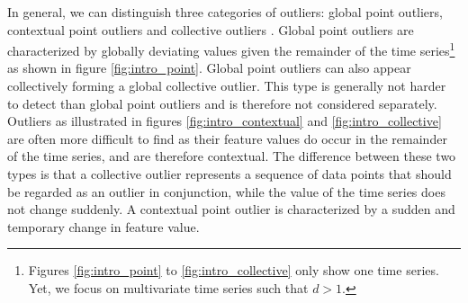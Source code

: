 In general, we can distinguish three categories of outliers: global point outliers, contextual point outliers and collective outliers \cite{chandola2009anomaly}. Global point outliers are characterized by globally deviating values given the remainder of the time series\footnote{Figures \ref{fig:intro_point} to \ref{fig:intro_collective} only show one time series. Yet, we focus on multivariate time series such that $d > 1$.} as shown in figure \ref{fig:intro_point}. Global point outliers can also appear collectively forming a global collective outlier. This type is generally not harder to detect than global point outliers and is therefore not considered separately. 
Outliers as illustrated in figures \ref{fig:intro_contextual} and \ref{fig:intro_collective} are often more difficult to find as their feature values do occur in the remainder of the time series, and are therefore contextual. The difference between these two types is that a collective outlier represents a sequence of data points that should be regarded as an outlier in conjunction, while the value of the time series does not change suddenly. A contextual point outlier is characterized by a sudden and temporary change in feature value.

